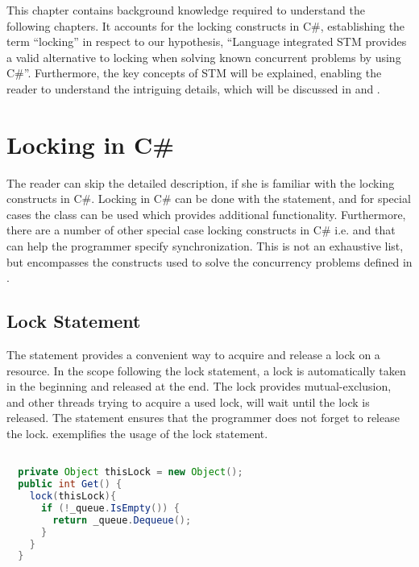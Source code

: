 \makeatletter {}\makeatother
{}
This chapter contains background knowledge required to understand the following chapters. It accounts for the locking constructs in C\#, establishing the term ``locking''  in respect to our hypothesis, ``Language integrated \ac{STM} provides a valid alternative to locking when solving known concurrent problems by using C\#''. Furthermore, the key concepts of \ac{STM} will be explained, enabling the reader to understand the intriguing details, which will be discussed in  and .

\section{Locking in C\#}\label{sec:locking}
The reader can skip the detailed description, if she is familiar with the locking constructs in C\#. Locking in C\# can be done with the  statement, and for special cases the  class can be used which provides additional functionality. Furthermore, there are a number of other special case locking constructs in C\#\cite{microsoftSyncPrim} i.e.    and  that can help the programmer specify synchronization. This is not an exhaustive list, but encompasses the constructs used to solve the concurrency problems defined in .
\subsection{Lock Statement}\label{subsec:lock_statement}
The  statement provides a convenient way to acquire and release a lock on a resource. In the scope following the lock statement, a lock is automatically taken in the beginning and released at the end. The lock provides mutual-exclusion, and other threads trying to acquire a used lock, will wait until the lock is released. The  statement ensures that the programmer does not forget to release the lock.  exemplifies the usage of the lock statement. 
\begin{lstlisting}[float, label=lst:lock_statement,
  caption={Lock Statement},
  language=Java,  
  showspaces=false,
  showtabs=false,
  breaklines=true,
  showstringspaces=false,
  breakatwhitespace=true,
  commentstyle=\color{greencomments},
  keywordstyle=\color{bluekeywords},
  stringstyle=\color{redstrings},
  morekeywords={atomic, retry, orElse}]  % Start your code-block

  private Object thisLock = new Object();
  public int Get() { 
    lock(thisLock){
      if (!_queue.IsEmpty()) {
        return _queue.Dequeue();
      }
    }
  }
\end{lstlisting}
